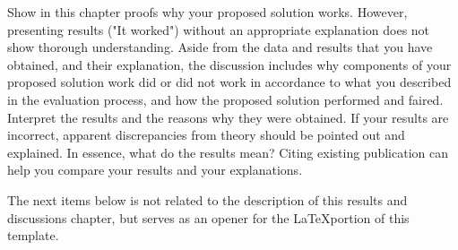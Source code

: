 
Show in this chapter proofs why your proposed solution works.  However, presenting results ("It worked") without an appropriate explanation does not show thorough understanding.  Aside from the data and results that you have obtained, and their explanation, the discussion includes why components of your proposed solution work did or did not work in accordance to what you described in the evaluation process, and how the proposed solution performed and faired. Interpret the results and the reasons why they were obtained.  If your results are incorrect, apparent discrepancies from theory should be pointed out and explained. In essence, what do the results mean?  Citing existing publication can help you compare your results and your explanations. 

The next items below is not related to the description of this results and discussions chapter, but serves as an opener for the \LaTeX portion of this template.


